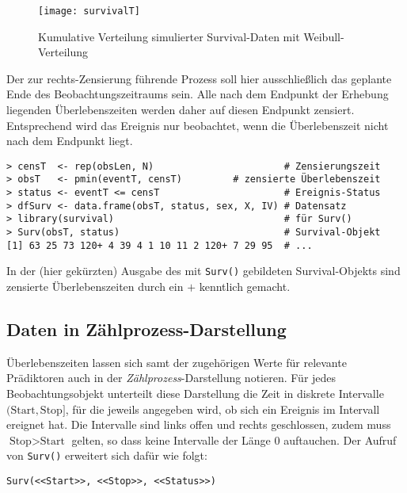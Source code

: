 \begin{figure}[ht]
\centering
\texttt{[image: survivalT]}
\vspace*{-1em}
\caption{Kumulative Verteilung simulierter Survival-Daten mit Weibull-Verteilung}
\label{fig:survivalT}
\end{figure}

Der zur rechts-Zensierung führende Prozess soll hier ausschließlich das geplante Ende des Beobachtungszeitraums sein. Alle nach dem Endpunkt der Erhebung liegenden Überlebenszeiten werden daher auf diesen Endpunkt zensiert. Entsprechend wird das Ereignis nur beobachtet, wenn die Überlebenszeit nicht nach dem Endpunkt liegt.
\begin{lstlisting}
> censT  <- rep(obsLen, N)                       # Zensierungszeit
> obsT   <- pmin(eventT, censT)         # zensierte Überlebenszeit
> status <- eventT <= censT                      # Ereignis-Status
> dfSurv <- data.frame(obsT, status, sex, X, IV) # Datensatz
> library(survival)                              # für Surv()
> Surv(obsT, status)                             # Survival-Objekt
[1] 63 25 73 120+ 4 39 4 1 10 11 2 120+ 7 29 95  # ...
\end{lstlisting}

In der (hier gekürzten) Ausgabe des mit \lstinline!Surv()! gebildeten Survival-Objekts sind zensierte Überlebenszeiten durch ein $+$ kenntlich gemacht.

\subsection{Daten in Zählprozess-Darstellung}
\label{sec:survTimeDep}

Überlebenszeiten lassen sich samt der zugehörigen Werte für relevante Prädiktoren auch in der \emph{Zählprozess}-Darstellung notieren. Für jedes Beobachtungsobjekt unterteilt diese Darstellung die Zeit in diskrete Intervalle $(\text{Start}, \text{Stop}]$, für die jeweils angegeben wird, ob sich ein Ereignis im Intervall ereignet hat. Die Intervalle sind links offen und rechts geschlossen, zudem muss $\text{Stop} > \text{Start}$ gelten, so dass keine Intervalle der Länge $0$ auftauchen. Der Aufruf von \lstinline!Surv()! erweitert sich dafür wie folgt:
\begin{lstlisting}
Surv(<<Start>>, <<Stop>>, <<Status>>)
\end{lstlisting}


